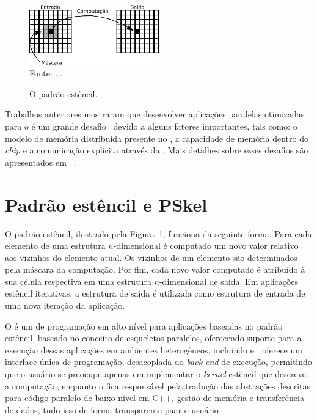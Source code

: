 \begin{figure}
    \centering
    \caption{O padrão estêncil.}
    \includegraphics[width=0.5\textwidth]{figs/stencilComputation.pdf} \\
    Fonte: ...
    \label{fig:stencil}
\end{figure}



Trabalhos anteriores mostraram que desenvolver aplicações paralelas otimizadas
para o \mppa é um grande desafio~\cite{francesquini:hal-01092325} devido a alguns
fatores importantes, tais como: o modelo de memória distribuída presente no
\mppa, a capacidade de memória dentro do \textit{chip} e a comunicação explícita
através da \noc. Mais detalhes sobre esses desafios são apresentados em
~\cite{wscad2017}.

\section{Padrão estêncil e PSkel}
\label{subsec:pskel}

O padrão estêncil, ilustrado pela Figura~\ref{fig:stencil}, funciona da
seguinte forma. Para cada elemento de
uma estrutura $n$-dimensional é computado um novo valor relativo aos vizinhos do
elemento atual. Os vizinhos de um elemento são determinados pela máscara da
computação. Por fim, cada novo valor computado é atribuído à sua célula
respectiva em uma estrutura $n$-dimensional de saída. Em aplicações
estêncil iterativas, a estrutura de saída é utilizada como
estrutura de entrada de uma nova iteração da aplicação.

O \pskel é um \fw de programação em alto nível para aplicações baseadas no
padrão estêncil, baseado no conceito de esqueletos paralelos, oferecendo suporte para a execução dessas aplicações em
ambientes heterogêneos, incluindo \cpu e \gpu. \pskel oferece um interface única de programação, desacoplada do \textit{back-end} de execução, permitindo que o usuário se preocupe apenas em implementar o \textit{kernel} estêncil que descreve a computação, enquanto o \fw fica responsável pela tradução das abstrações descritas para código paralelo de baixo nível em C++, gestão de memória e transferência de dados, tudo isso de forma transparente paar o usuário~\cite{CPE:CPE3479}.


